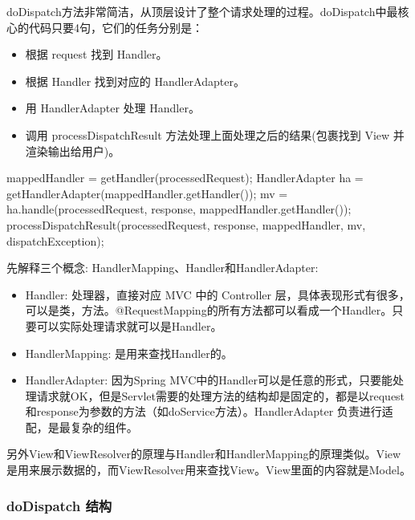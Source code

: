 doDispatch方法非常简洁，从顶层设计了整个请求处理的过程。doDispatch中最核心的代码只要4句，它们的任务分别是：

\begin{itemize}
    \item 根据 request 找到 Handler。
    \item 根据 Handler 找到对应的 HandlerAdapter。
    \item 用 HandlerAdapter 处理 Handler。
    \item 调用 processDispatchResult 方法处理上面处理之后的结果(包裹找到 View 并渲染输出给用户)。
\end{itemize}

\begin{Java}
mappedHandler = getHandler(processedRequest);
HandlerAdapter ha = getHandlerAdapter(mappedHandler.getHandler());
mv = ha.handle(processedRequest, response, mappedHandler.getHandler());
processDispatchResult(processedRequest, response, mappedHandler, mv, dispatchException);
\end{Java}

先解释三个概念: HandlerMapping、Handler和HandlerAdapter:
\begin{itemize}
    \item Handler: 处理器，直接对应 MVC 中的 Controller 层，具体表现形式有很多，可以是类，方法。@RequestMapping的所有方法都可以看成一个Handler。只要可以实际处理请求就可以是Handler。
    \item HandlerMapping: 是用来查找Handler的。
    \item HandlerAdapter: 因为Spring MVC中的Handler可以是任意的形式，只要能处理请求就OK，但是Servlet需要的处理方法的结构却是固定的，都是以request和response为参数的方法（如doService方法）。HandlerAdapter 负责进行适配，是最复杂的组件。
\end{itemize}

另外View和ViewResolver的原理与Handler和HandlerMapping的原理类似。View是用来展示数据的，而ViewResolver用来查找View。View里面的内容就是Model。

\subsubsection{doDispatch 结构}

\newpage